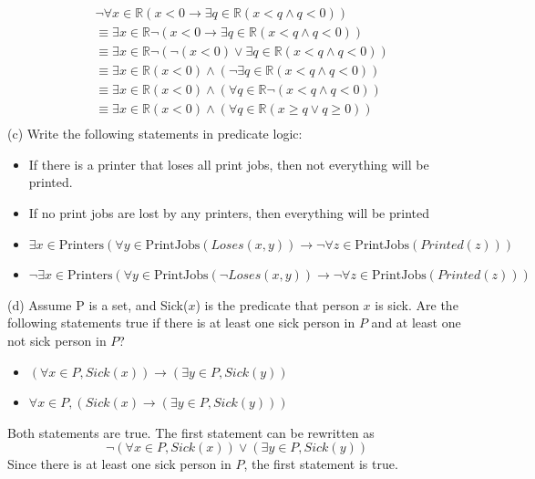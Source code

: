 \documentclass[11pt]{article}
\begin{document}
\solution
\begin{align*}
    &\lnot \forall x\in \mathbb{R}(x < 0 \to \exists q\in \mathbb{R}(x < q \land q < 0))\\
    &\equiv \exists x\in \mathbb{R} \lnot (x < 0 \to \exists q\in \mathbb{R}(x < q \land q < 0))\\
    &\equiv \exists x\in \mathbb{R} \lnot (\lnot (x < 0) \lor \exists q\in \mathbb{R}(x<q\land q < 0))\\
    &\equiv \exists x\in\mathbb{R} (x < 0) \land (\lnot\exists q\in \mathbb{R}(x<q\land q < 0)) \\
    &\equiv \exists x\in\mathbb{R} (x < 0) \land (\forall q\in \mathbb{R}\lnot(x<q\land q < 0)) \\
    &\equiv \exists x\in\mathbb{R} (x < 0) \land (\forall q\in \mathbb{R}(x\geq q\lor q \geq 0)) \\
\end{align*}
(c) Write the following statements in predicate logic:
\begin{itemize}
    \item If there is a printer that loses all print jobs, then not everything will be printed.
    \item If no print jobs are lost by any printers, then everything will be printed
\end{itemize}
\solution
\begin{itemize}
    \item $\exists x\in \text{Printers}(\forall y\in \text{PrintJobs}(Loses(x,y)) \to \lnot \forall z\in \text{PrintJobs}(Printed(z)))$
    \item $\lnot \exists x\in \text{Printers}(\forall y\in \text{PrintJobs}(\lnot Loses(x,y)) \to \lnot \forall z\in \text{PrintJobs}(Printed(z)))$
\end{itemize}

(d) Assume P is a set, and Sick($x$) is the predicate that person $x$ is sick. Are the following statements true if there is at least one sick person in $P$ and at least one not sick person in $P$?
\begin{itemize}
    \item $(\forall x\in P, Sick(x))\to (\exists y\in P, Sick(y))$
    \item $\forall x\in P, (Sick(x)\to (\exists y\in P, Sick(y)))$
\end{itemize}

\solution

Both statements are true. The first statement can be rewritten as
\[\lnot (\forall x\in P, Sick(x)) \lor (\exists y\in P, Sick(y))\]
Since there is at least one sick person in $P$, the first statement is true.
\end{document}
